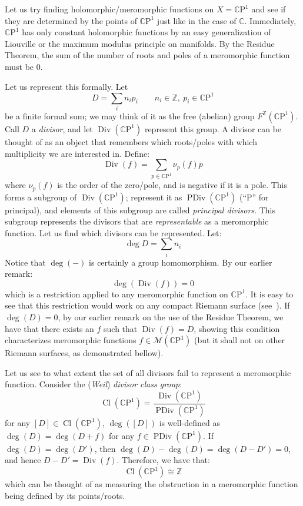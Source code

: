 \documentclass{ut-thesis}
\newcommand{\Z}{{\mathbb{Z}}}
\newcommand{\C}{{\mathbb{C}}}
\newcommand{\CM}{{\mathcal{M}}}
\newcommand{\CP}{{\mathbb{C}\mathrm{P}}}
\newcommand{\Div}{{\operatorname{Div}}}
\newcommand{\PDiv}{{\operatorname{PDiv}}}
\renewcommand{\deg}{{\operatorname{deg}}}
\renewcommand{\div}{{\operatorname{Div}}}
\newcommand{\Cl}{{\operatorname{Cl}}}
\begin{document}
Let us try finding holomorphic/meromorphic functions on $X = \CP^1$ and see if they are
determined by the points of $\CP^1$ just like in the case of $\C$. Immediately, $\CP^1$ has only constant holomorphic functions by an easy
generalization of Liouville or the maximum modulus principle on manifolds. By the Residue Theorem, the sum of
the number of roots and poles of a meromorphic function must be $0$.

Let us represent this formally. Let
\[
  D = \sum_i n_ip_i \qquad n_i\in \Z,\ p_i \in \CP^1
\]
be a finite formal sum; we may think of it as the free (abelian) group $F^{\Z}(\CP^1)$. Call $D$
a \emph{divisor}, and let $\Div(\CP^1)$
represent this group. A divisor can be thought of as an object that remembers which roots/poles with which
multiplicity we are interested in. Define:
\[
  \div(f) =  \sum_{p \in \CP^1} \nu_{p}(f)p
\]
where $\nu_{p}(f)$ is the order of the zero/pole, and is negative if it is a pole. This forms a subgroup of
$\Div(\CP^1)$; represent it as $\PDiv(\CP^1)$ (``P'' for principal), and elements of this subgroup are called
\emph{principal divisors}. This subgroup represents the divisors that are \emph{representable} as a
meromorphic function. Let us find which divisors can be represented. Let:
\[
  \deg D = \sum_i n_i
\]
Notice that $\deg(-)$ is certainly a group homomorphism. By our earlier remark:
\[
  \deg(\div(f)) = 0
\]
which is a restriction applied to any meromorphic function on $\CP^1$. It is easy to see that this restriction
would work on any compact Riemann surface (see~\cite[chapter~6]{NateComplexAnalysis}). If $\deg(D) = 0$, by
our earlier remark on the use of the Residue Theorem, we have that there exists an $f$ such that $\div(f) = D$,
showing this condition characterizes meromorphic functions $f \in \CM(\CP^1)$ (but it shall not on other
Riemann surfaces, as demonstrated bellow).

Let us see to what extent the set of all divisors fail to represent a meromorphic function. Consider the
(\emph{Weil})\emph{ divisor class group}:
\[
  \Cl(\CP^1) = \frac{\Div(\CP^1)}{\PDiv(\CP^1)}
\]
for any $[D] \in \Cl(\CP^1)$, $\deg([D])$ is well-defined as $\deg(D) = \deg(D + f)$ for any $f \in
\PDiv(\CP^1)$. If $\deg(D) = \deg(D')$, then $\deg(D) - \deg(D) = \deg(D-D') = 0$, and hence $D-D'
= \div(f)$. Therefore, we have that:
\[
  \Cl(\CP^1) \cong \Z
\]
which can be thought of as measuring the obstruction in a meromorphic function being defined by its
points/roots.
\end{document}
